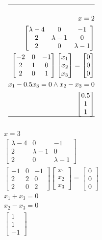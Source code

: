 \documentclass[12pt, a4paper]{article}
\begin{document}
\begin{align*}
					\hline\\
					x=2\\
					\begin{bmatrix}\lambda-4&0&-1\\2&\lambda-1&0\\2&0&\lambda-1\end{bmatrix}\\
					\begin{bmatrix}-2&0&-1\\2&1&0\\2&0&1\end{bmatrix}\begin{bmatrix}x_1\\x_2\\x_3\end{bmatrix}=\begin{bmatrix}0\\0\\0\end{bmatrix}\\
					x_1-0.5x_3=0\land x_2-x_3=0\\
					\begin{bmatrix}0.5\\1\\1\end{bmatrix}\\
					\hline\\
				\end{align*}
				\begin{align*}
					x=3\\
					\begin{bmatrix}\lambda-4&0&-1\\2&\lambda-1&0\\2&0&\lambda-1\end{bmatrix}\\
					\begin{bmatrix}-1&0&-1\\2&2&0\\2&0&2\end{bmatrix}\begin{bmatrix}x_1\\x_2\\x_3\end{bmatrix}=\begin{bmatrix}0\\0\\0\end{bmatrix}\\
					x_1+x_3=0\\
					x_2-x_3=0\\
					\begin{bmatrix}1\\1\\-1\end{bmatrix}
				\end{align*}
\end{document}

